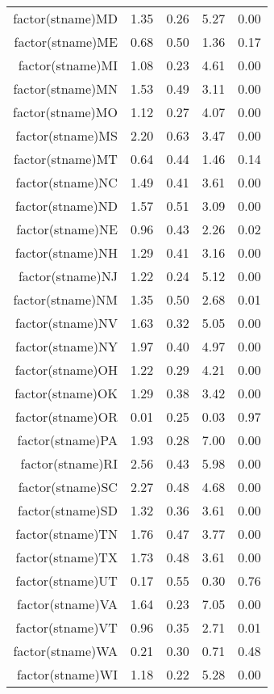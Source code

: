 \begin{table}[ht]
\begin{tabular}{rrrrr}
  factor(stname)MD & 1.35 & 0.26 & 5.27 & 0.00 \\ 
  factor(stname)ME & 0.68 & 0.50 & 1.36 & 0.17 \\ 
  factor(stname)MI & 1.08 & 0.23 & 4.61 & 0.00 \\ 
  factor(stname)MN & 1.53 & 0.49 & 3.11 & 0.00 \\ 
  factor(stname)MO & 1.12 & 0.27 & 4.07 & 0.00 \\ 
  factor(stname)MS & 2.20 & 0.63 & 3.47 & 0.00 \\ 
  factor(stname)MT & 0.64 & 0.44 & 1.46 & 0.14 \\ 
  factor(stname)NC & 1.49 & 0.41 & 3.61 & 0.00 \\ 
  factor(stname)ND & 1.57 & 0.51 & 3.09 & 0.00 \\ 
  factor(stname)NE & 0.96 & 0.43 & 2.26 & 0.02 \\ 
  factor(stname)NH & 1.29 & 0.41 & 3.16 & 0.00 \\ 
  factor(stname)NJ & 1.22 & 0.24 & 5.12 & 0.00 \\ 
  factor(stname)NM & 1.35 & 0.50 & 2.68 & 0.01 \\ 
  factor(stname)NV & 1.63 & 0.32 & 5.05 & 0.00 \\ 
  factor(stname)NY & 1.97 & 0.40 & 4.97 & 0.00 \\ 
  factor(stname)OH & 1.22 & 0.29 & 4.21 & 0.00 \\ 
  factor(stname)OK & 1.29 & 0.38 & 3.42 & 0.00 \\ 
  factor(stname)OR & 0.01 & 0.25 & 0.03 & 0.97 \\ 
  factor(stname)PA & 1.93 & 0.28 & 7.00 & 0.00 \\ 
  factor(stname)RI & 2.56 & 0.43 & 5.98 & 0.00 \\ 
  factor(stname)SC & 2.27 & 0.48 & 4.68 & 0.00 \\ 
  factor(stname)SD & 1.32 & 0.36 & 3.61 & 0.00 \\ 
  factor(stname)TN & 1.76 & 0.47 & 3.77 & 0.00 \\ 
  factor(stname)TX & 1.73 & 0.48 & 3.61 & 0.00 \\ 
  factor(stname)UT & 0.17 & 0.55 & 0.30 & 0.76 \\ 
  factor(stname)VA & 1.64 & 0.23 & 7.05 & 0.00 \\ 
  factor(stname)VT & 0.96 & 0.35 & 2.71 & 0.01 \\ 
  factor(stname)WA & 0.21 & 0.30 & 0.71 & 0.48 \\ 
  factor(stname)WI & 1.18 & 0.22 & 5.28 & 0.00 \\ 

\end{tabular}
\end{table}
